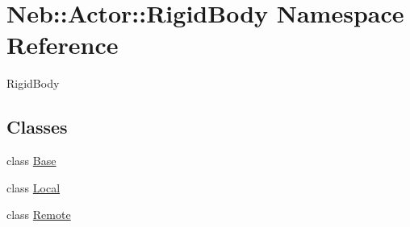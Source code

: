 \hypertarget{namespaceNeb_1_1Actor_1_1RigidBody}{\section{\-Neb\-:\-:\-Actor\-:\-:\-Rigid\-Body \-Namespace \-Reference}
\label{namespaceNeb_1_1Actor_1_1RigidBody}
}


\-Rigid\-Body  


\subsection*{\-Classes}
\begin{DoxyCompactItemize}
\item 
class \hyperlink{classNeb_1_1Actor_1_1RigidBody_1_1Base}{\-Base}
\item 
class \hyperlink{classNeb_1_1Actor_1_1RigidBody_1_1Local}{\-Local}
\item 
class \hyperlink{classNeb_1_1Actor_1_1RigidBody_1_1Remote}{\-Remote}
\end{DoxyCompactItemize}
